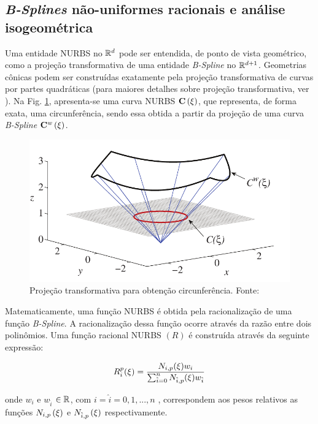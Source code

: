 \documentclass[tese_patricia]{subfiles}
\begin{document}
\subsection{\textit{B-Splines} não-uniformes racionais e análise isogeométrica}

Uma entidade NURBS no $\mathbb{R}^{d}$ pode ser entendida, de ponto de vista geométrico, como a projeção transformativa de uma entidade \textit{B-Spline} no $\mathbb{R}^{d+1}$. Geometrias cônicas podem ser construídas exatamente pela projeção transformativa de curvas por partes quadráticas (para maiores detalhes sobre projeção transformativa, ver ). Na Fig. \ref{fig:circunferencia}, apresenta-se uma curva NURBS $\mathbf{C}\left(\xi\right)$, que representa, de forma exata, uma circunferência, sendo essa obtida a partir da projeção de uma curva \textit{B-Spline} $\mathbf{C}^{w}\left(\xi\right)$.

\begin{figure}[htb!]
	\centering 
	\includegraphics[scale=0.3,trim=0cm 0cm 0cm 0cm, clip=true]{Imagens/Cap3/transformacaoprojetiva.png}	
	\caption{Projeção transformativa para obtenção circunferência. Fonte: }
	\label{fig:circunferencia}
\end{figure}

Matematicamente, uma função NURBS é obtida pela racionalização de uma função \textit{B-Spline}. A racionalização dessa função ocorre através da razão entre dois polinômios. Uma função racional NURBS $\left(R\right)$ é construída através da seguinte expressão:

\begin{align}
R_{i}^{p}(\xi) = \frac{N_{i,p}(\xi)w_i}{\sum_{\hat{i}=0}^{n}N_{\hat{i},p}(\xi)w_{\hat{i}}}
\end{align}

\noindent onde $w_i$ e $w_{\hat{i}}$ $\in \mathbb{R}$, com $i = \hat{i} =  0, 1, ... , n$ , correspondem aos pesos relativos as funções $N_{i,p}\left(\xi\right)$ e $N_{\hat{i},p}\left(\xi\right)$ respectivamente. 
\end{document}
